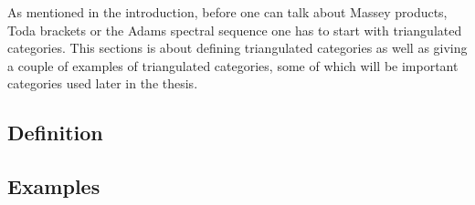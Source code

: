 As mentioned in the introduction, before one can talk about Massey products, Toda brackets or the Adams spectral sequence one has to start with triangulated categories. This sections is about defining triangulated categories as well as giving a couple of examples of triangulated categories, some of which will be important categories used later in the thesis.

\subsection{Definition}


\subsection{Examples}
